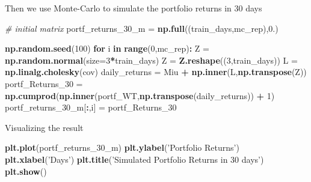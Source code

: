 \documentclass[]{book}
\newenvironment{Shaded}{\begin{snugshade}}{\end{snugshade}}
\newcommand{\CommentTok}[1]{\textcolor[rgb]{0.56,0.35,0.01}{\textit{#1}}}
\newcommand{\ControlFlowTok}[1]{\textcolor[rgb]{0.13,0.29,0.53}{\textbf{#1}}}
\newcommand{\DataTypeTok}[1]{\textcolor[rgb]{0.13,0.29,0.53}{#1}}
\newcommand{\DecValTok}[1]{\textcolor[rgb]{0.00,0.00,0.81}{#1}}
\newcommand{\FloatTok}[1]{\textcolor[rgb]{0.00,0.00,0.81}{#1}}
\newcommand{\KeywordTok}[1]{\textcolor[rgb]{0.13,0.29,0.53}{\textbf{#1}}}
\newcommand{\NormalTok}[1]{#1}
\newcommand{\OperatorTok}[1]{\textcolor[rgb]{0.81,0.36,0.00}{\textbf{#1}}}
\newcommand{\StringTok}[1]{\textcolor[rgb]{0.31,0.60,0.02}{#1}}
\begin{document}
Then we use Monte-Carlo to simulate the portfolio returns in 30 days

\begin{Shaded}
\begin{Highlighting}[]
\CommentTok{# initial matrix}
\NormalTok{portf_returns_}\DecValTok{30}\NormalTok{_m =}\StringTok{ }\KeywordTok{np.full}\NormalTok{((train_days,mc_rep),}\FloatTok{0.}\NormalTok{)}

\KeywordTok{np.random.seed}\NormalTok{(}\DecValTok{100}\NormalTok{)}
\ControlFlowTok{for}\NormalTok{ i }\ControlFlowTok{in} \KeywordTok{range}\NormalTok{(}\DecValTok{0}\NormalTok{,mc_rep)}\OperatorTok{:}
\StringTok{    }\NormalTok{Z =}\StringTok{ }\KeywordTok{np.random.normal}\NormalTok{(}\DataTypeTok{size=}\DecValTok{3}\OperatorTok{*}\NormalTok{train_days)}
\NormalTok{    Z =}\StringTok{ }\KeywordTok{Z.reshape}\NormalTok{((}\DecValTok{3}\NormalTok{,train_days))}
\NormalTok{    L =}\StringTok{ }\KeywordTok{np.linalg.cholesky}\NormalTok{(cov)}
\NormalTok{    daily_returns =}\StringTok{ }\NormalTok{Miu }\OperatorTok{+}\StringTok{ }\KeywordTok{np.inner}\NormalTok{(L,}\KeywordTok{np.transpose}\NormalTok{(Z))}
\NormalTok{    portf_Returns_}\DecValTok{30}\NormalTok{ =}\StringTok{ }\KeywordTok{np.cumprod}\NormalTok{(}\KeywordTok{np.inner}\NormalTok{(portf_WT,}\KeywordTok{np.transpose}\NormalTok{(daily_returns)) }\OperatorTok{+}\StringTok{ }\DecValTok{1}\NormalTok{)}
\NormalTok{    portf_returns_}\DecValTok{30}\NormalTok{_m[}\OperatorTok{:}\NormalTok{,i] =}\StringTok{ }\NormalTok{portf_Returns_}\DecValTok{30}
\end{Highlighting}
\end{Shaded}

Visualizing the result

\begin{Shaded}
\begin{Highlighting}[]
\KeywordTok{plt.plot}\NormalTok{(portf_returns_}\DecValTok{30}\NormalTok{_m)}
\KeywordTok{plt.ylabel}\NormalTok{(}\StringTok{'Portfolio Returns'}\NormalTok{)}
\KeywordTok{plt.xlabel}\NormalTok{(}\StringTok{'Days'}\NormalTok{)}
\KeywordTok{plt.title}\NormalTok{(}\StringTok{'Simulated Portfolio Returns in 30 days'}\NormalTok{)}
\KeywordTok{plt.show}\NormalTok{()}
\end{Highlighting}
\end{Shaded}
\end{document}
